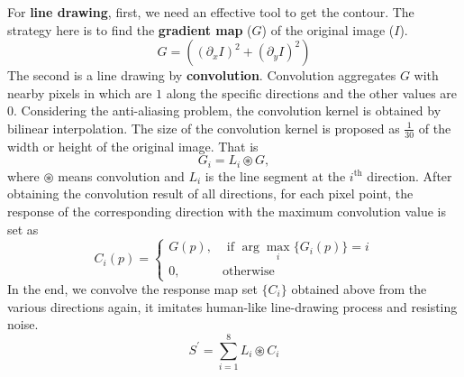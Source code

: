 For \textbf{line drawing}, first, we need an effective tool to get the contour. The strategy here is to find the \textbf{gradient map} (\(G\)) of the original image (\(I\)).
\[
  G = \left( (\partial_{x}I)^{2} + (\partial_{y}I)^{2} \right)
\]
The second is a line drawing by \textbf{convolution}. Convolution aggregates \(G\) with nearby pixels in which are \(1\) along the specific directions and the other values are \(0\). Considering the anti-aliasing problem, the convolution kernel is obtained by bilinear interpolation.
The size of the convolution kernel is
proposed as \(\frac{1}{30}\) of the width or height of the original image. That is
\[
  G_{i} = L_{i} \circledast G, 
\]
where \(\circledast\) means convolution and \(L_{i}\) is the line segment at the \(i^{\mbox{th}}\) direction.
After obtaining the convolution result of all directions, for each pixel point, the response of the corresponding direction with the maximum convolution value is set as
\[
C_{i}(p) = 
\begin{cases}
  G(p), & \mbox{ if } \arg \max_{i} \{G_{i}(p)\} = i\\
  0, & \mbox{otherwise}
\end{cases}
\]
In the end, we convolve the response map set \(\{C_{i}\}\) obtained above from the various directions again, it imitates human-like line-drawing process and resisting noise.
\[
S^{'}=\sum_{i=1}^{8} L_{i} \circledast C_{i}
\]

